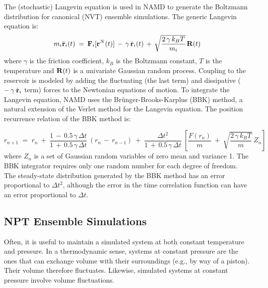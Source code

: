 The (stochastic) Langevin equation is used in NAMD to generate the Boltzmann distribution for canonical (NVT) ensemble simulations. The generic Langevin equation is:
\begin{equation}\label{eq:NVT-Langevin}
m_i \ddot{\bold{r}}_i(t) \:=\: \bold{F}_i[\bold{r}^N(t)] \,-\, \gamma \, \dot{\bold{r}}_i(t) \,+\, \sqrt{\frac{2 \, \gamma \, k_B T}{m_i}} \, \bold{R}(t)
\end{equation}
where $\gamma$ is the friction coefficient, $k_B$ is the Boltzmann constant, $T$ is the temperature and $\bold{R}(t)$ is a univariate Gaussian random process. Coupling to the reservoir is modeled by adding the fluctuating (the last term) and dissipative ($-\,  \gamma \: \dot{\bold{r}}_i $ term) forces to the Newtonian equations of motion. To integrate the Langevin equation, NAMD uses the Br\"{u}nger-Brooks-Karplus (BBK) method, a natural extension of the Verlet method for the Langevin equation. The position recurrence relation of the BBK method is:

\begin{equation}
r_{n+1} \;=\; r_n \:+\: \frac{1 \,-\, 0.5 \, \gamma \, \Delta t}{1 \,+\, 0.5 \, \gamma \, \Delta t} \: (r_n \,-\, r_{n-1}) \:+\: \frac{\Delta t^2}{1 \,+\, 0.5 \, \gamma \, \Delta t} \: \left[ \frac{F(r_n)}{m} \:+\: \sqrt{\frac{2\, \gamma \, k_B T}{m}} \: Z_n \right]
\end{equation}
where $Z_n$ is a set of Gaussian random variables of zero mean and variance 1. The BBK integrator requires only one random number for each degree of freedom. The steady-state distribution generated by the BBK method has an error proportional to $\Delta t^2$, although the error in the time correlation function can have an error proportional to $\Delta t$.

\subsection{NPT Ensemble Simulations}
Often, it is useful to maintain a simulated system at both constant temperature and pressure. In a thermodynamic sense, systems at constant pressure are the ones that can exchange volume with their surroundings (e.g., by way of a piston). Their volume therefore fluctuates. Likewise, simulated systems at constant pressure involve volume fluctuations.

